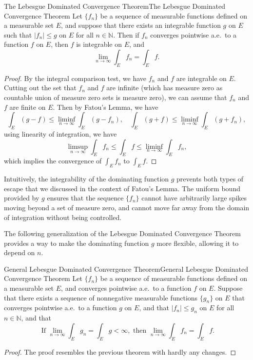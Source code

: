 \documentclass[../main.tex]{subfiles}
\begin{document}
\begin{theorem}{The Lebesgue Dominated Convergence Theorem}{The Lebesgue Dominated Convergence Theorem}
	Let $\{ f_n \}$ be a sequence of measurable functions defined on a measurable set $E$, and suppose that there exists an integrable function $g$ on $E$ such that $|f_n| \leq g$ on $E$ for all $n \in \mathbb{N}$. Then if $f_n$ converges pointwise a.e.\ to a function $f$ on $E$, then $f$ is integrable on $E$, and
	\begin{equation*}
		\lim_{n \to \infty} \int_E f_n = \int_E f.
	\end{equation*}
\end{theorem}
\begin{proof}
	By the integral comparison test, we have $f_n$ and $f$ are integrable on $E$. Cutting out the set that $f_n$ and $f$ are infinite (which has measure zero as countable union of measure zero sets is measure zero), we can assume that $f_n$ and $f$ are finite on $E$. Then by Fatou's Lemma, we have
	\begin{equation*}
		\int_E (g - f) \leq \liminf_{n \to \infty} \int_E (g - f_n), \quad \int_E (g + f) \leq \liminf_{n \to \infty} \int_E (g + f_n),
	\end{equation*}
	using linearity of integration, we have
	\begin{equation*}
		\limsup_{n \to \infty} \int_E f_n \leq \int_E f \leq \liminf_{n \to \infty} \int_E f_n,
	\end{equation*}
	which implies the convergence of $\int_E f_n$ to $\int_E f$.
\end{proof}

\begin{remark}
	Intuitively, the integrability of the dominating function $g$ prevents both types of escape that we discussed in the context of Fatou's Lemma. The uniform bound provided by $g$ ensures that the sequence $\{ f_n \}$ cannot have arbitrarily large spikes moving beyond a set of measure zero, and cannot move far away from the domain of integration without being controlled.
\end{remark}

The following generalization of the Lebesgue Dominated Convergence Theorem provides a way to make the dominating function $g$ more flexible, allowing it to depend on $n$.
\begin{theorem}{General Lebesgue Dominated Convergence Theorem}{General Lebesgue Dominated Convergence Theorem}
	Let $\{ f_n \}$ be a sequence of measurable functions defined on a measurable set $E$, and converges pointwise a.e.\ to a function $f$ on $E$. Suppose that there exists a sequence of nonnegative measurable functions $\{ g_n \}$ on $E$ that converges pointwise a.e.\ to a function $g$ on $E$, and that $|f_n| \leq g_n$ on $E$ for all $n \in \mathbb{N}$, and that
	\begin{equation}
		\text{ If } \lim_{n \to \infty} \int_E g_n = \int_E g < \infty, \text{ then } \lim_{n \to \infty} \int_E f_n = \int_E f.
	\end{equation}
\end{theorem}
\begin{proof}
	The proof resembles the previous theorem with hardly any changes.
\end{proof}
\end{document}
